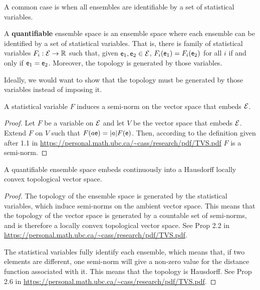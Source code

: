 A common case is when all ensembles are identifiable by a set of statistical variables.

\begin{defn}
	A \textbf{quantifiable} ensemble space is an ensemble space where each ensemble can be identified by a set of statistical variables. That is, there is family of statistical variables $F_i : \mathcal{E} \to \mathbb{R}$ such that, given $\mathsf{e}_1, \mathsf{e}_2 \in \mathcal{E}$, $F_i(\mathsf{e}_1) = F_i(\mathsf{e}_2)$ for all $i$ if and only if $\mathsf{e}_1 = \mathsf{e}_2$. Moreover, the topology is generated by those variables.
\end{defn}

\begin{remark}
	Ideally, we would want to show that the topology must be generated by those variables instead of imposing it.
\end{remark}

\begin{prop}
	A statistical variable $F$ induces a semi-norm on the vector space that embeds $\mathcal{E}$.
\end{prop}

\begin{proof}
	Let $F$ be a variable on $\mathcal{E}$ and let $V$ be the vector space that embeds $\mathcal{E}$. Extend $F$ on $V$ such that $F(a\mathsf{e}) = |a| F(\mathsf{e})$. Then, according to the definition given after 1.1 in \url{https://personal.math.ubc.ca/~cass/research/pdf/TVS.pdf} $F$ is a semi-norm.
\end{proof}


\begin{prop}
	A quantifiable ensemble space embeds continuously into a Hausdorff locally convex topological vector space.
\end{prop}

\begin{proof}
	The topology of the ensemble space is generated by the statistical variables, which induce semi-norms on the ambient vector space. This means that the topology of the vector space is generated by a countable set of semi-norms, and is therefore a locally convex topological vector space. See Prop 2.2 in \url{https://personal.math.ubc.ca/~cass/research/pdf/TVS.pdf}.
	
	The statistical variables fully identify each ensemble, which means that, if two elements are different, one semi-norm will give a non-zero value for the distance function associated with it. This means that the topology is Hausdorff. See Prop 2.6 in \url{https://personal.math.ubc.ca/~cass/research/pdf/TVS.pdf}.
\end{proof}

